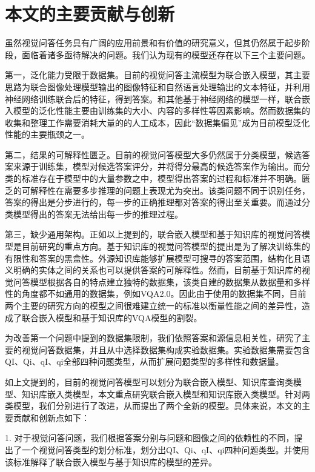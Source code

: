 \section{本文的主要贡献与创新}
虽然视觉问答任务具有广阔的应用前景和有价值的研究意义，但其仍然属于起步阶段，面临着诸多亟待解决的问题。我们认为现有的模型还存在以下三个主要问题。

第一，泛化能力受限于数据集。目前的视觉问答主流模型为联合嵌入模型，其主要思路为联合图像处理模型输出的图像特征和自然语言处理输出的文本特征，并利用神经网络训练联合后的特征，得到答案。和其他基于神经网络的模型一样，联合嵌入模型的泛化性能主要由训练集的大小、内容的多样性等因素影响。然而数据集的收集和整理工作需要消耗大量的的人工成本，因此“数据集偏见”成为目前模型泛化性能的主要瓶颈之一。

第二，结果的可解释性匮乏。目前的视觉问答模型大多仍然属于分类模型，候选答案来源于训练集，模型对候选答案评分，并将得分最高的候选答案作为输出。而分类的标准存在于模型中的大量参数之中，模型得出答案的过程和标准并不明确。匮乏的可解释性在需要多步推理的问题上表现尤为突出。该类问题不同于识别任务，答案的得出是分步进行的，每一步的正确推理都对答案的得出至关重要。而通过分类模型得出的答案无法给出每一步的推理过程。

第三，缺少通用架构。正如以上提到的，联合嵌入模型和基于知识库的视觉问答模型是目前研究的重点方向。基于知识库的视觉问答模型的提出是为了解决训练集的有限性和答案的黑盒性。外源知识库能够扩展模型可搜寻的答案范围，结构化且语义明确的实体之间的关系也可以提供答案的可解释性。然而，目前基于知识库的视觉问答模型根据各自的特点建立独特的数据集，该类自建的数据集从数据量和多样性的角度都不如通用的数据集，例如VQA2.0。因此由于使用的数据集不同，目前两个主要的研究方向的模型之间很难建立统一的标准以衡量性能之间的差异性，造成了联合嵌入模型和基于知识库的VQA模型的割裂。

为改善第一个问题中提到的数据集限制，我们依照答案和源信息相关性，研究了主要的视觉问答数据集，并且从中选择数据集构成实验数据集。实验数据集需要包含QI、Qi、qI、qi全部四种问题类型，从而扩展问题类型的多样性和数据量。

如上文提到的，目前的视觉问答模型可以划分为联合嵌入模型、知识库查询类模型、知识库嵌入类模型，本文重点研究联合嵌入模型和知识库嵌入类模型。针对两类模型，我们分别进行了改进，从而提出了两个全新的模型。具体来说，本文的主要贡献和创新点如下：

1. 对于视觉问答问题，我们根据答案分别与问题和图像之间的依赖性的不同，提出了一个视觉问答类型的划分标准，划分出QI、Qi、qI、qi四种问题类型。并使用该标准解释了联合嵌入模型与基于知识库的模型的差异。

